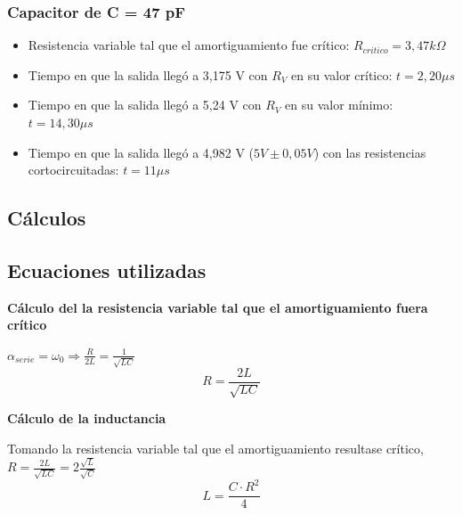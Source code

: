 \documentclass{article}
\begin{document}
        \par
        \subsubsection*{Capacitor de C = 47 pF}
            \begin{itemize}
                \item Resistencia variable tal que el amortiguamiento fue crítico: $ R_{critico} = 3,47 k\Omega $ %
                \item Tiempo en que la salida llegó a 3,175 V con $ R_V $ en su valor crítico: $ t = 2,20 \mu s$ %
                \item Tiempo en que la salida llegó a 5,24 V con $ R_V $ en su valor mínimo: $ t = 14,30 \mu s$ %
                \item Tiempo en que la salida llegó a 4,982 V ($ 5V \pm 0,05V $) con las resistencias cortocircuitadas: $ t = 11 \mu s$ %
            \end{itemize}

    \subsection{Cálculos}

        \subsection{Ecuaciones utilizadas}            

            \textbf{Cálculo del la resistencia variable tal que el amortiguamiento fuera crítico} \par \par
            $ \alpha_{serie} = \omega_0 \Rightarrow \frac{R}{2L} = \frac{1}{\sqrt{LC}}  $
            \begin{equation}
                R = \frac{2L}{\sqrt{LC}}
            \end{equation}  \par \par 

            \textbf{Cálculo de la inductancia} \par \par
            Tomando la resistencia variable tal que el amortiguamiento resultase crítico,
            $ R = \frac{2L}{\sqrt{LC}} = 2\frac{\sqrt{L}}{\sqrt{C}} $
            \begin{equation}
                L = \frac{C \cdot R^2}{4}
            \end{equation}
\end{document}
